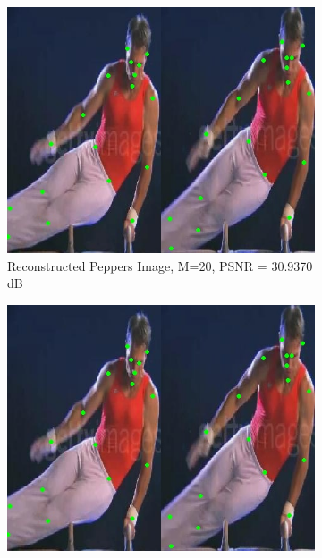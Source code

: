 \documentclass[conference]{IEEEtran}
\begin{document}
\begin{figure}[htbp]{}
\begin{subfigure}[t]{1.6cm}
\includegraphics[width=\linewidth, height=\linewidth]{dm1}
\caption{Reconstructed Peppers Image, M=20, PSNR = 30.9370 dB} 
\label{caro1}
\end{subfigure}
\begin{subfigure}[t]{1.6cm}
\includegraphics[width=\linewidth, height=\linewidth]{dm1}

\end{subfigure}
\end{figure}
\end{document}
